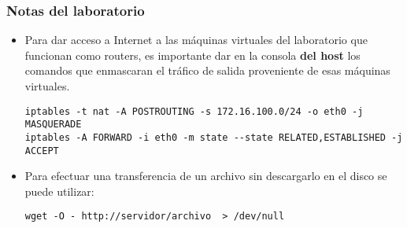 \subsubsection{Notas del laboratorio}
\begin{itemize}
	\item Para dar acceso a Internet a las máquinas virtuales del laboratorio que funcionan como routers, es importante dar en la consola \textbf{del host} los comandos que enmascaran el tráfico de salida proveniente de esas máquinas virtuales.
\begin{lstlisting}
iptables -t nat -A POSTROUTING -s 172.16.100.0/24 -o eth0 -j MASQUERADE
iptables -A FORWARD -i eth0 -m state --state RELATED,ESTABLISHED -j ACCEPT
\end{lstlisting}
	\item Para efectuar una transferencia de un archivo sin descargarlo en el disco se puede utilizar:
\begin{lstlisting}
wget -O - http://servidor/archivo  > /dev/null
\end{lstlisting}
\end{itemize}
